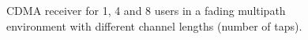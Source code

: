 \documentclass[a4paper]{article}
\begin{document}
\begin{figure}
    \centering
        
      \caption{CDMA receiver for 1, 4 and 8 users in a fading multipath environment with different channel lengths (number of taps).}
    \label{fig:channellength}
    \end{figure}
\end{document}
